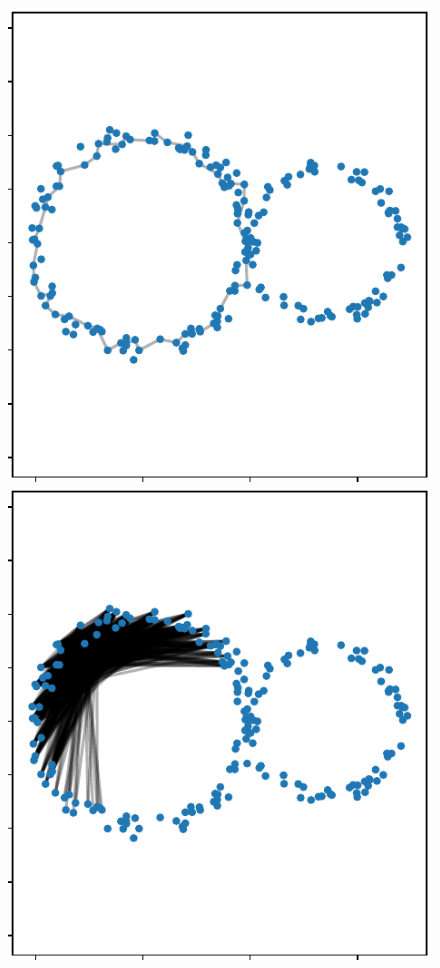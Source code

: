 \begin{figure}[htbp]
\centering
    \includegraphics[scale=0.66]{figures/homology_cycle1.pdf}
    \includegraphics[scale=0.66]{figures/cohomology_cocycle1.pdf}

\end{figure}

